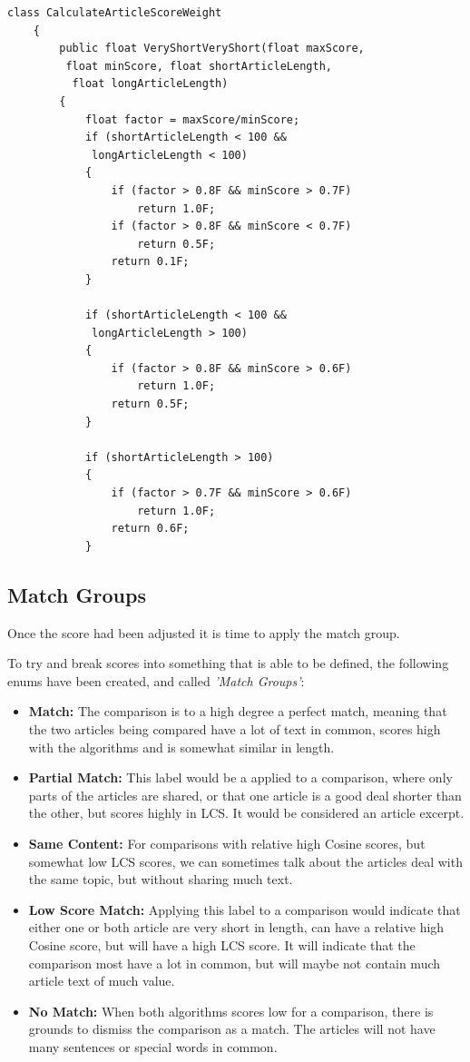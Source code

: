 \lstset{style=sharpc}
\begin{lstlisting}[caption=Part of the method for applying LCS score weight, captionpos=b]
 class CalculateArticleScoreWeight
    {
        public float VeryShortVeryShort(float maxScore,
         float minScore, float shortArticleLength,
          float longArticleLength)
        {
            float factor = maxScore/minScore;
            if (shortArticleLength < 100 &&
             longArticleLength < 100)
            {
                if (factor > 0.8F && minScore > 0.7F)
                    return 1.0F;
                if (factor > 0.8F && minScore < 0.7F)
                    return 0.5F;
                return 0.1F;
            }

            if (shortArticleLength < 100 &&
             longArticleLength > 100)
            {
                if (factor > 0.8F && minScore > 0.6F)
                    return 1.0F;
                return 0.5F;
            }

            if (shortArticleLength > 100)
            {
                if (factor > 0.7F && minScore > 0.6F)
                    return 1.0F;
                return 0.6F;
            }
\end{lstlisting}

\subsection{Match Groups} 
Once the score had been adjusted it is time to apply the match group.

To try and break scores into something that is able to be defined, the following enums have been created, and called \textit{'Match Groups'}:

\begin{itemize}
\item \textbf{Match:} The comparison is to a high degree a perfect match, meaning that the two articles being compared have a lot of text in common, scores high with the algorithms and is somewhat similar in length.
\item \textbf{Partial Match:} This label would be a applied to a comparison, where only parts of the articles are shared, or that one article is a good deal shorter than the other, but scores highly in LCS. It would be considered an article excerpt.
\item \textbf{Same Content:} For comparisons with relative high Cosine scores, but somewhat low LCS scores, we can sometimes talk about the articles deal with the same topic, but without sharing much text. 
\item \textbf{Low Score Match:} Applying this label to a comparison would indicate that either one or both article are very short in length, can have a relative high Cosine score, but will have a high LCS score. It will indicate that the comparison most have a lot in common, but will maybe not contain much article text of much value.
\item \textbf{No Match:} When both algorithms scores low for a comparison, there is grounds to dismiss the comparison as a match. The articles will not have many sentences or special words in common.
\end{itemize}

